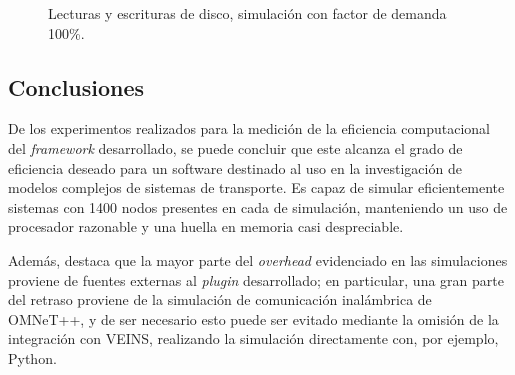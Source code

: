 \begin{figure}[tpb]
    \centering
    
    \caption[I/O en disco durante simulación]{Lecturas y escrituras de disco, simulación con factor de demanda 100\%.}
    \label{fig:systemload:io}
\end{figure} 

\subsection{Conclusiones}

De los experimentos realizados para la medición de la eficiencia computacional del \emph{framework} desarrollado, se puede concluir que este alcanza el grado de eficiencia deseado para un software destinado al uso en la investigación de modelos complejos de sistemas de transporte. Es capaz de simular eficientemente sistemas con 1400 nodos presentes en cada de simulación, manteniendo un uso de procesador razonable y una huella en memoria casi despreciable. 

Además, destaca que la mayor parte del \emph{overhead} evidenciado en las simulaciones proviene de fuentes externas al \emph{plugin} desarrollado; en particular, una gran parte del retraso proviene de la simulación de comunicación inalámbrica de OMNeT++, y de ser necesario esto puede ser evitado mediante la omisión de la integración con VEINS, realizando la simulación directamente con, por ejemplo, Python.

